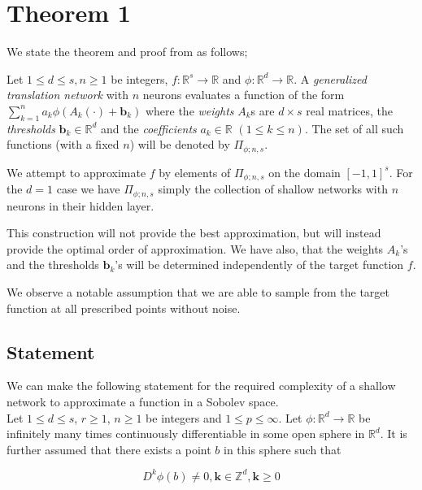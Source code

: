 \documentclass[11pt,a4paper]{article}
\theoremstyle{plain}
\theoremstyle{definition}
\theoremstyle{remark}
\numberwithin{equation}{section}
\begin{document}


\section{Theorem 1}

We state the theorem and proof from \cite{Mhaskar} as follows;

Let $1 \leq d \leq s, n \geq 1$ be integers, $f : \mathbb{R}^s \rightarrow \mathbb{R}$ and $\phi : \mathbb{R}^d \rightarrow \mathbb{R}$. A \textit{generalized translation network} with $n$ neurons evaluates a function of the form $\sum_{k=1}^n a_k \phi(A_k (\cdot) + \mathbf{b}_k)$ where the \textit{weights} $A_k$s are $d \times s$ real matrices, the \textit{thresholds} $\mathbf{b}_k \in \mathbb{R}^d$ and the \textit{coefficients} $a_k \in \mathbb{R}$ $(1 \leq k \leq n)$. The set of all such functions (with a fixed $n$) will be denoted by $\Pi_{\phi;n,s}$.

We attempt to approximate \(f\) by elements of \(\Pi_{\phi;n,s}\) on the domain \([-1,1]^s\). For the \(d=1\) case we have \(\Pi_{\phi;n,s} \) simply the collection of shallow networks with \(n\) neurons in their hidden layer.

This construction will not provide the best approximation, but will instead provide the optimal order of approximation. We have also, that the weights \(A_{k}\)'s and the thresholds \(\mathbf{b}_{k}\)'s  will be determined independently of the target function
\(f\).

We observe a notable assumption that we are able to sample from the
target function at all prescribed points without noise.




\subsection{Statement}


We can make the following statement for the required complexity of a shallow network to approximate a function in a Sobolev space.\\

Let \(1 \leq d \leq s\), \(r \geq 1\), \(n \geq 1\) be integers and \(1 \leq p \leq \infty\). Let \(\phi: \mathbb{R}^d \rightarrow \mathbb{R}\) be infinitely many times continuously differentiable in some open sphere in \(\mathbb{R}^d\). It is further assumed that there exists a point \(b\) in this sphere such that

\begin{equation}
    D^k \phi(b) \neq 0, \mathbf{k} \in \mathbb{Z}^d, \mathbf{k} \geq 0
    \label{derCondition}
\end{equation}
\end{document}

